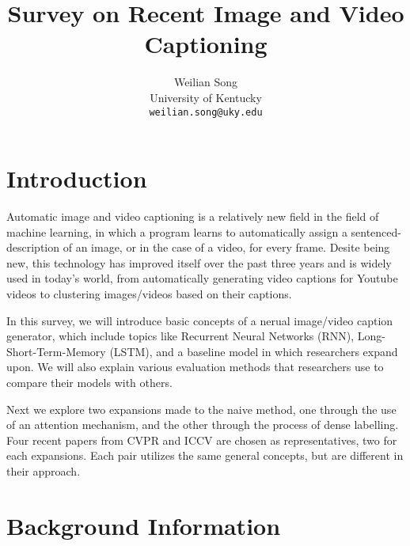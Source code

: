 \documentclass[12pt,onecolumn,letterpaper,draftclsnofoot]{article}
\begin{document}
\title{Survey on Recent Image and Video Captioning}

\author{Weilian Song\\
University of Kentucky\\
{\tt\small weilian.song@uky.edu}
}

\maketitle

\section{Introduction}

Automatic image and video captioning is a relatively new field in the field of
machine learning, in which a program learns to automatically assign a
sentenced-description of an image, or in the case of a video, for every frame.
Desite being new, this technology has improved itself over the past three
years and is widely used in today's world, from automatically generating video
captions for Youtube videos to clustering images/videos based on their
captions.

In this survey, we will introduce basic concepts of a nerual image/video
caption generator, which include topics like Recurrent Neural Networks (RNN),
Long-Short-Term-Memory (LSTM), and a baseline model in which researchers
expand upon. We will also explain various evaluation methods that researchers
use to compare their models with others.

Next we explore two expansions made to the naive method, one through the use
of an attention mechanism, and the other through the process of dense
labelling. Four recent papers from CVPR and ICCV are chosen as
representatives, two for each expansions. Each pair utilizes the same general
concepts, but are different in their approach.

\section{Background Information}
\end{document}
